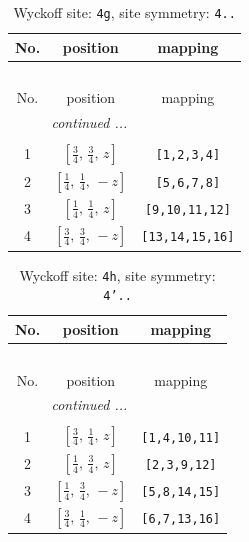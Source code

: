 \documentclass[fleqn,8pt]{jsarticle}
\begin{document}
\renewcommand{\arraystretch}{1.2}
\begin{longtable}{ccc}
\caption{Wyckoff site: {\tt 4g}, site symmetry: {\tt 4..}}
 \\
 \hline \hline
No. & position & mapping \\ \hline \endfirsthead

\multicolumn{2}{l}{\tablename\ \thetable{}} \\
 \hline \hline
No. & position & mapping \\ \hline \endhead

 \hline \hline
\multicolumn{2}{r}{\footnotesize\it continued ...} \\ \endfoot

 \hline \hline
\multicolumn{2}{r}{} \\ \endlastfoot

1 & $\left[ \frac{3}{4},\, \frac{3}{4},\, z \right]$ & {\tt [1,2,3,4]} \\ \hline
2 & $\left[ \frac{1}{4},\, \frac{1}{4},\, - z \right]$ & {\tt [5,6,7,8]} \\ \hline
3 & $\left[ \frac{1}{4},\, \frac{1}{4},\, z \right]$ & {\tt [9,10,11,12]} \\ \hline
4 & $\left[ \frac{3}{4},\, \frac{3}{4},\, - z \right]$ & {\tt [13,14,15,16]} \\
\end{longtable}
\renewcommand{\arraystretch}{1.2}
\begin{longtable}{ccc}
\caption{Wyckoff site: {\tt 4h}, site symmetry: {\tt 4'..}}
 \\
 \hline \hline
No. & position & mapping \\ \hline \endfirsthead

\multicolumn{2}{l}{\tablename\ \thetable{}} \\
 \hline \hline
No. & position & mapping \\ \hline \endhead

 \hline \hline
\multicolumn{2}{r}{\footnotesize\it continued ...} \\ \endfoot

 \hline \hline
\multicolumn{2}{r}{} \\ \endlastfoot

1 & $\left[ \frac{3}{4},\, \frac{1}{4},\, z \right]$ & {\tt [1,4,10,11]} \\ \hline
2 & $\left[ \frac{1}{4},\, \frac{3}{4},\, z \right]$ & {\tt [2,3,9,12]} \\ \hline
3 & $\left[ \frac{1}{4},\, \frac{3}{4},\, - z \right]$ & {\tt [5,8,14,15]} \\ \hline
4 & $\left[ \frac{3}{4},\, \frac{1}{4},\, - z \right]$ & {\tt [6,7,13,16]} \\
\end{longtable}
\end{document}

